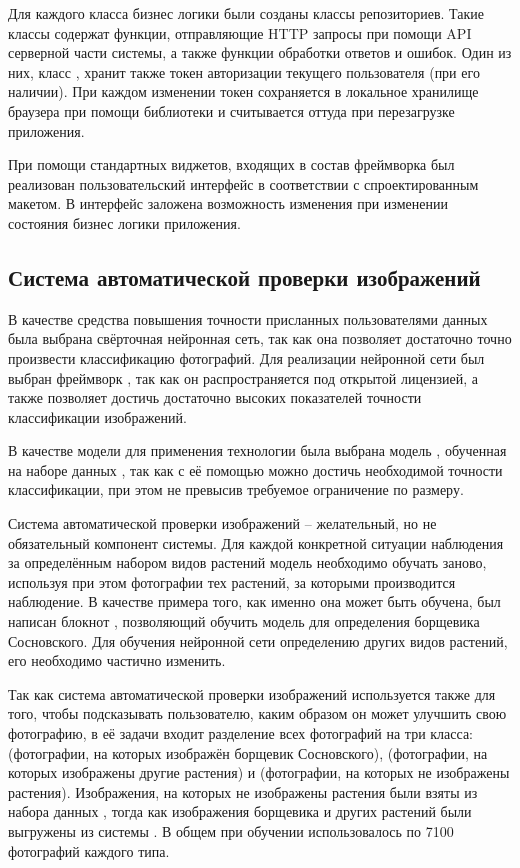 \tab
Для каждого класса бизнес логики были созданы классы репозиториев.
Такие классы содержат функции, отправляющие HTTP запросы при помощи API серверной части системы, а также функции обработки ответов и ошибок.
Один из них, класс , хранит также токен авторизации текущего пользователя (при его наличии).
При каждом изменении токен сохраняется в локальное хранилище браузера при помощи библиотеки  и считывается оттуда при перезагрузке приложения.

\tab
При помощи стандартных виджетов, входящих в состав фреймворка  был реализован пользовательский интерфейс в соответствии с спроектированным макетом.
В интерфейс заложена возможность изменения при изменении состояния бизнес логики приложения.

\subsection{Система автоматической проверки изображений}

\tab
В качестве средства повышения точности присланных пользователями данных была выбрана свёрточная нейронная сеть\cite{convolutional-better}, так как она позволяет достаточно точно произвести классификацию фотографий.
Для реализации нейронной сети был выбран фреймворк \cite{tensorflow-better}, так как он распространяется под открытой лицензией, а также позволяет достичь достаточно высоких показателей точности классификации изображений.

\tab
В качестве модели для применения технологии  была выбрана модель \cite{mobilenet-better}, обученная на наборе данных , так как с её помощью можно достичь необходимой точности классификации, при этом не превысив требуемое ограничение по размеру.

\tab
Система автоматической проверки изображений -- желательный, но не обязательный компонент системы.
Для каждой конкретной ситуации наблюдения за определённым набором видов растений модель необходимо обучать заново, используя при этом фотографии тех растений, за которыми производится наблюдение.
В качестве примера того, как именно она может быть обучена, был написан блокнот , позволяющий обучить модель для определения борщевика Сосновского.
Для обучения нейронной сети определению других видов растений, его необходимо частично изменить. 

\tab
Так как система автоматической проверки изображений используется также для того, чтобы подсказывать пользователю, каким образом он может улучшить свою фотографию, в её задачи входит разделение всех фотографий на три класса:  (фотографии, на которых изображён борщевик Сосновского),  (фотографии, на которых изображены другие растения) и  (фотографии, на которых не изображены растения).
Изображения, на которых не изображены растения были взяты из набора данных \cite{openimage-better}, тогда как изображения борщевика и других растений были выгружены из системы \cite{inaturalist}.
В общем при обучении использовалось по 7100 фотографий каждого типа.

